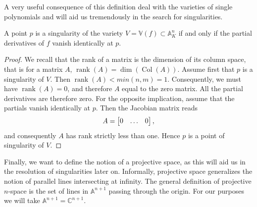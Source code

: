 \documentclass{article}
\newcommand{\C}{\ensuremath{\mathbb{C}}}
\newcommand{\A}{\ensuremath{\mathbb{A}}}
\newcommand{\V}{\ensuremath{\mathbb{V}}}
\DeclareMathOperator{\Col}{Col}
\DeclareMathOperator{\rank}{rank}
\begin{document}
    A very useful consequence of this definition deal with the varieties of
    single polynomials and will aid us tremendously in the search for
    singularities.
    \begin{corollary}
        \label{crl:single_poly}
        A point $p$ is a singularity of the variety $V = \V(f) \subset \A_K^n$
        if and only if the partial derivatives of $f$ vanish identically at
        $p$. 
    \end{corollary}
    \begin{proof}
        We recall that the rank of a matrix is the dimension of its column
        space, that is for a matrix $A$, $\rank(A) = \dim(\Col(A))$.  Assume
        first that $p$ is a singularity of $V$. Then $\rank(A) < min(n, m) =
        1$. Consequently, we must have $\rank(A) = 0$, and therefore $A$ equal
        to the zero matrix. All the partial derivatives are therefore zero.
        For the opposite implication, assume that the partials vanish
        identically at $p$. Then the Jacobian matrix reads
        \begin{equation}
            \notag
            A = \begin{bmatrix}
                0 & \hdots & 0
            \end{bmatrix},
        \end{equation}
        and consequently $A$ has rank strictly less than one. Hence $p$ is a
        point of singularity of $V$.
    \end{proof}
    
    Finally, we want to define the notion of a projective space, as this will
    aid us in the resolution of singularities later on.  Informally, projective
    space generalizes the notion of parallel lines intersecting at infinity.
    The general definition of projective $n$-space is the set of lines in
    $\A^{n+1}$ passing through the origin. For our purposes we will take
    $\A^{n+1} = \C^{n+1}$.
\end{document}
